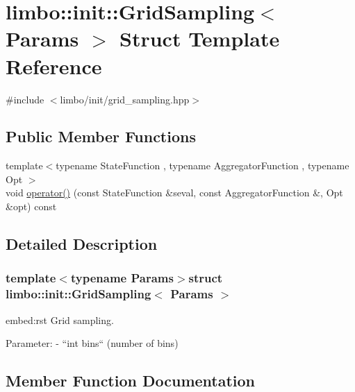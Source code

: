 \hypertarget{structlimbo_1_1init_1_1_grid_sampling}{}\section{limbo\+:\+:init\+:\+:Grid\+Sampling$<$ Params $>$ Struct Template Reference}
\label{structlimbo_1_1init_1_1_grid_sampling}


{\ttfamily \#include $<$limbo/init/grid\+\_\+sampling.\+hpp$>$}

\subsection*{Public Member Functions}
\begin{DoxyCompactItemize}
\item 
{\footnotesize template$<$typename State\+Function , typename Aggregator\+Function , typename Opt $>$ }\\void \hyperlink{structlimbo_1_1init_1_1_grid_sampling_a9b17fba72e1ae09a3361e9dcb8ff3fe3}{operator()} (const State\+Function \&seval, const Aggregator\+Function \&, Opt \&opt) const 
\end{DoxyCompactItemize}


\subsection{Detailed Description}
\subsubsection*{template$<$typename Params$>$struct limbo\+::init\+::\+Grid\+Sampling$<$ Params $>$}

\begin{DoxyVerb}embed:rst
Grid sampling.

Parameter:
  - ``int bins`` (number of bins)
\end{DoxyVerb}
 

\subsection{Member Function Documentation}
\hypertarget{structlimbo_1_1init_1_1_grid_sampling_a9b17fba72e1ae09a3361e9dcb8ff3fe3}{}
